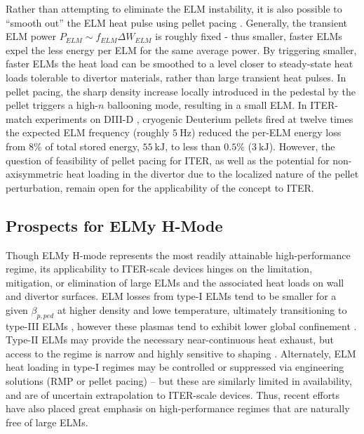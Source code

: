 Rather than attempting to eliminate the ELM instability, it is also possible to ``smooth out'' the ELM heat pulse using pellet pacing \cite{Baylor2013}.  Generally, the transient ELM power $P_{ELM} \sim f_{ELM} \Delta W_{ELM}$ is roughly fixed - thus smaller, faster ELMs expel the less energy per ELM for the same average power.  By triggering smaller, faster ELMs the heat load can be smoothed to a level closer to steady-state heat loads tolerable to divertor materials, rather than large transient heat pulses.  In pellet pacing, the sharp density increase locally introduced in the pedestal by the pellet triggers a high-$n$ ballooning mode, resulting in a small ELM.  In ITER-match experiments on DIII-D \cite{Baylor2013}, cryogenic Deuterium pellets fired at twelve times the expected ELM frequency (roughly $\SI{5}{\hertz}$) reduced the per-ELM energy loss from $8\%$ of total stored energy, $\SI{55}{\kilo\joule}$, to less than $0.5\%$ ($\SI{3}{\kilo\joule}$).  However, the question of feasibility of pellet pacing for ITER, as well as the potential for non-axisymmetric heat loading in the divertor due to the localized nature of the pellet perturbation, remain open for the applicability of the concept to ITER.

\subsection{Prospects for ELMy H-Mode}\label{subsec:hcr_elmy_prospects}

Though ELMy H-mode represents the most readily attainable high-performance regime, its applicability to ITER-scale devices hinges on the limitation, mitigation, or elimination of large ELMs and the associated heat loads on wall and divertor surfaces.  ELM losses from type-I ELMs tend to be smaller for a given $\beta_{p,ped}$ at higher density and lowe temperature, ultimately transitioning to type-III ELMs \cite{Urano2003}, however these plasmas tend to exhibit lower global confinement \cite{Saibene1999}.  Type-II ELMs may provide the necessary near-continuous heat exhaust, but access to the regime is narrow and highly sensitive to shaping \cite{Suttrop2003}.  Alternately, ELM heat loading in type-I regimes may be controlled or suppressed via engineering solutions (\ie RMP or pellet pacing) -- but these are similarly limited in availability, and are of uncertain extrapolation to ITER-scale devices.  Thus, recent efforts have also placed great emphasis on high-performance regimes that are naturally free of 
large ELMs.\nicesectionending


